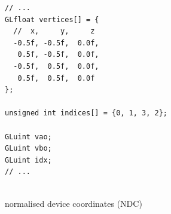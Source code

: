 \documentclass[calcdimensions,landscape,letterpaper]{powersem}
\newcommand{\thecurrentheading}{}
\newcommand{\heading}[1]{\renewcommand{\thecurrentheading}{#1}}
\begin{document}
\begin{slide}
    \heading{Pipeline Input: Vertex and Index Data}
    \begin{center}
        \begin{minipage}[b]{.55\textwidth}
            \begin{verbatim}
// ...
GLfloat vertices[] = {
  //  x,     y,     z
  -0.5f, -0.5f,  0.0f,
   0.5f, -0.5f,  0.0f,
  -0.5f,  0.5f,  0.0f,
   0.5f,  0.5f,  0.0f
};

unsigned int indices[] = {0, 1, 3, 2};

GLuint vao;
GLuint vbo;
GLuint idx;
// ...
            \end{verbatim}
        \end{minipage}
        \begin{minipage}[b]{.4\textwidth}
          \\
          normalised device coordinates (NDC)
        \end{minipage}
    \end{center}
\end{slide}
\end{document}
